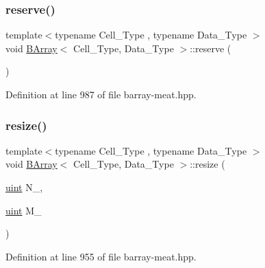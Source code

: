 \subsubsection{\texorpdfstring{reserve()}{reserve()}}
{\footnotesize\ttfamily template$<$typename Cell\+\_\+\+Type , typename Data\+\_\+\+Type $>$ \\
void \hyperlink{class_b_array}{B\+Array}$<$ Cell\+\_\+\+Type, Data\+\_\+\+Type $>$\+::reserve (\begin{DoxyParamCaption}{ }\end{DoxyParamCaption})\hspace{0.3cm}{\ttfamily [inline]}}



Definition at line 987 of file barray-\/meat.\+hpp.

\mbox{\label{class_b_array_aefe411fe1890273518bfbc3f8ca616ce}} 
\subsubsection{\texorpdfstring{resize()}{resize()}}
{\footnotesize\ttfamily template$<$typename Cell\+\_\+\+Type , typename Data\+\_\+\+Type $>$ \\
void \hyperlink{class_b_array}{B\+Array}$<$ Cell\+\_\+\+Type, Data\+\_\+\+Type $>$\+::resize (\begin{DoxyParamCaption}\item[{\hyperlink{typedefs_8hpp_a91ad9478d81a7aaf2593e8d9c3d06a14}{uint}}]{N\+\_\+,  }\item[{\hyperlink{typedefs_8hpp_a91ad9478d81a7aaf2593e8d9c3d06a14}{uint}}]{M\+\_\+ }\end{DoxyParamCaption})\hspace{0.3cm}{\ttfamily [inline]}}



Definition at line 955 of file barray-\/meat.\+hpp.

\mbox{\label{class_b_array_aaead894ff275479db4f733793ce037db}} 
